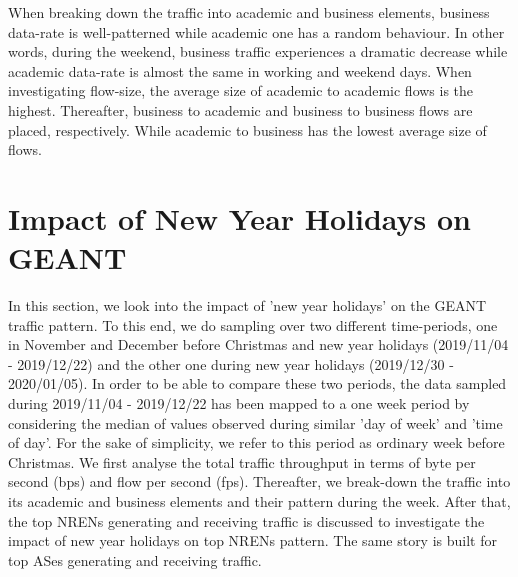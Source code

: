 \documentclass[10pt, journal, letterpaper]{IEEEtran}
\begin{document}
When breaking down the traffic into academic and business elements, business data-rate is well-patterned while academic one has a random behaviour. In other words, during the weekend, business traffic experiences a dramatic decrease while academic data-rate is almost the same in working and weekend days. When investigating flow-size, the average size of academic to academic flows is the highest. Thereafter, business to academic and business to business flows are placed, respectively. While academic to business has the lowest average size of flows.

\section{Impact of New Year Holidays on GEANT}
In this section, we look into the impact of 'new year holidays' on the GEANT traffic pattern. To this end, we do sampling over two different time-periods, one in November and December before Christmas and new year holidays (2019/11/04 - 2019/12/22) and the other one during new year holidays (2019/12/30 - 2020/01/05). In order to be able to compare these two periods, the data sampled during 2019/11/04 - 2019/12/22 has been mapped to a one week period by considering the median of values observed during similar 'day of week' and 'time of day'. For the sake of simplicity, we refer to this period as ordinary week before Christmas. We first analyse the total traffic throughput in terms of byte per second (bps) and flow per second (fps). Thereafter, we break-down the traffic into its academic and business elements and their pattern during the week. After that, the top NRENs generating and receiving traffic is discussed to investigate the impact of new year holidays on top NRENs pattern. The same story is built for top ASes generating and receiving traffic.
\end{document}
